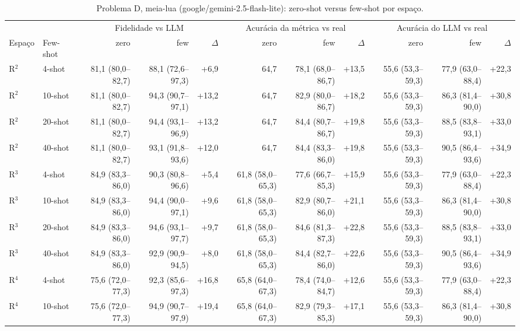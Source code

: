 \begin{table}[htbp]
\centering
\footnotesize
\caption{Problema D, meia-lua (google/gemini-2.5-flash-lite): zero-shot versus few-shot por espaço.}
\label{tab:bloco1_D_zero_vs_fewshot_comparacao_flashlite}
\begin{tabular}{llrrrrrrrrr}
\toprule
 &  & \multicolumn{3}{c}{Fidelidade vs LLM} & \multicolumn{3}{c}{Acurácia da métrica vs real} & \multicolumn{3}{c}{Acurácia do LLM vs real} \\ \cmidrule(lr){3-5} \cmidrule(lr){6-8} \cmidrule(lr){9-11}
Espaço & Few-shot & zero & few & $\Delta$ & zero & few & $\Delta$ & zero & few & $\Delta$ \\
\midrule
R$^2$ & 4-shot & 81,1 (80,0–82,7) & 88,1 (72,6–97,3) & +6,9 & 64,7 & 78,1 (68,0–86,7) & +13,5 & 55,6 (53,3–59,3) & 77,9 (63,0–88,4) & +22,3 \\
R$^2$ & 10-shot & 81,1 (80,0–82,7) & 94,3 (90,7–97,1) & +13,2 & 64,7 & 82,9 (80,0–86,7) & +18,2 & 55,6 (53,3–59,3) & 86,3 (81,4–90,0) & +30,8 \\
R$^2$ & 20-shot & 81,1 (80,0–82,7) & 94,4 (93,1–96,9) & +13,2 & 64,7 & 84,4 (80,7–86,7) & +19,8 & 55,6 (53,3–59,3) & 88,5 (83,8–93,1) & +33,0 \\
R$^2$ & 40-shot & 81,1 (80,0–82,7) & 93,1 (91,8–93,6) & +12,0 & 64,7 & 84,4 (83,3–86,0) & +19,8 & 55,6 (53,3–59,3) & 90,5 (86,4–93,6) & +34,9 \\
\midrule
R$^3$ & 4-shot & 84,9 (83,3–86,0) & 90,3 (80,8–96,6) & +5,4 & 61,8 (58,0–65,3) & 77,6 (66,7–85,3) & +15,9 & 55,6 (53,3–59,3) & 77,9 (63,0–88,4) & +22,3 \\
R$^3$ & 10-shot & 84,9 (83,3–86,0) & 94,4 (90,0–97,1) & +9,6 & 61,8 (58,0–65,3) & 82,9 (80,7–86,0) & +21,1 & 55,6 (53,3–59,3) & 86,3 (81,4–90,0) & +30,8 \\
R$^3$ & 20-shot & 84,9 (83,3–86,0) & 94,6 (93,1–97,7) & +9,7 & 61,8 (58,0–65,3) & 84,6 (81,3–87,3) & +22,8 & 55,6 (53,3–59,3) & 88,5 (83,8–93,1) & +33,0 \\
R$^3$ & 40-shot & 84,9 (83,3–86,0) & 92,9 (90,9–94,5) & +8,0 & 61,8 (58,0–65,3) & 84,4 (82,7–86,0) & +22,6 & 55,6 (53,3–59,3) & 90,5 (86,4–93,6) & +34,9 \\
\midrule
R$^4$ & 4-shot & 75,6 (72,0–77,3) & 92,3 (85,6–97,3) & +16,8 & 65,8 (64,0–67,3) & 78,4 (74,0–84,7) & +12,6 & 55,6 (53,3–59,3) & 77,9 (63,0–88,4) & +22,3 \\
R$^4$ & 10-shot & 75,6 (72,0–77,3) & 94,9 (90,7–97,9) & +19,4 & 65,8 (64,0–67,3) & 82,9 (79,3–85,3) & +17,1 & 55,6 (53,3–59,3) & 86,3 (81,4–90,0) & +30,8 \\

\end{tabular}
\end{table}
